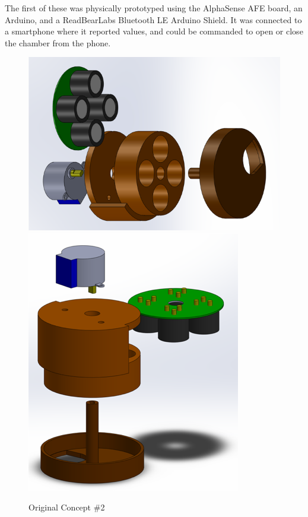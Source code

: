 The first of these was physically prototyped using the AlphaSense AFE board, an Arduino, and a ReadBearLabs Bluetooth LE Arduino Shield.  It was connected to a smartphone where it reported values, and could be commanded to open or close the chamber from the phone.

\begin{figure}[htb]
 	\includegraphics[width=\textwidth/2]{visuals/prevwork2a}    
 	\includegraphics[width=\textwidth/2]{visuals/prevwork2b}            
 	 \caption{Original Concept \#2}
  	\label{fig:prevwork1a}
\end{figure}


